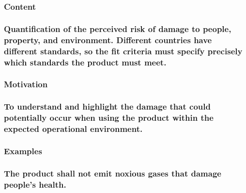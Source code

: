 \documentclass[
]{article}
\begin{document}
\hypertarget{content-38}{%
\subsubsection{Content}\label{content-38}}

\hypertarget{quantification-of-the-perceived-risk-of-damage-to-people-property-and-environment.-different-countries-have-different-standards-so-the-fit-criteria-must-specify-precisely-which-standards-the-product-must-meet.}{%
\subsubsection{Quantification of the perceived risk of damage to people,
property, and environment. Different countries have different standards,
so the fit criteria must specify precisely which standards the product
must
meet.}\label{quantification-of-the-perceived-risk-of-damage-to-people-property-and-environment.-different-countries-have-different-standards-so-the-fit-criteria-must-specify-precisely-which-standards-the-product-must-meet.}}

\hypertarget{motivation-37}{%
\subsubsection{Motivation}\label{motivation-37}}

\hypertarget{to-understand-and-highlight-the-damage-that-could-potentially-occur-when-using-the-product-within-the-expected-operational-environment.}{%
\subsubsection{\texorpdfstring{To understand and highlight the damage
that could potentially occur when using the product within the expected
operational environment.
}{To understand and highlight the damage that could potentially occur when using the product within the expected operational environment. }}\label{to-understand-and-highlight-the-damage-that-could-potentially-occur-when-using-the-product-within-the-expected-operational-environment.}}

\hypertarget{examples-22}{%
\subsubsection{Examples}\label{examples-22}}

\hypertarget{the-product-shall-not-emit-noxious-gases-that-damage-peoples-health.}{%
\subsubsection{The product shall not emit noxious gases that damage
people's
health.}\label{the-product-shall-not-emit-noxious-gases-that-damage-peoples-health.}}
\end{document}
